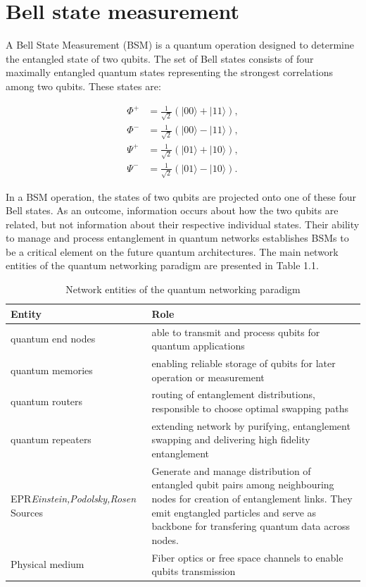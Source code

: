 \documentclass[12pt,a4paper] {report}
\begin{document}
		\section{Bell state measurement}

		A Bell State Measurement (BSM) is a quantum operation designed to determine
		the entangled state of two qubits. The set of Bell states consists of four 
		maximally entangled quantum states representing the strongest correlations
		among two qubits. These states are:

			\begin{align*}
			    \Phi^+ &= \frac{1}{\sqrt{2}} (|00\rangle + |11\rangle), \\
			    \Phi^- &= \frac{1}{\sqrt{2}} (|00\rangle - |11\rangle), \\
			    \Psi^+ &= \frac{1}{\sqrt{2}} (|01\rangle + |10\rangle), \\
			    \Psi^- &= \frac{1}{\sqrt{2}} (|01\rangle - |10\rangle).
			\end{align*}

		In a BSM operation, the states of two qubits are projected onto one of these four Bell states. 
		As an outcome, information occurs about how the two qubits are related, but not information
		about their respective individual states. Their ability to manage and process entanglement
		in quantum networks establishes BSMs to be a critical element on the future quantum architectures. The main network entities of the quantum networking paradigm\cite{e-qnet} are presented in Table 1.1.

		\begin{table}[h!]
		\centering
		\renewcommand{\arraystretch}{1.5}
			\begin{tabular}{|p{5.5cm}|p{10cm}|}
			\hline
			\textbf{Entity} & \textbf{Role} \\ \hline
			quantum end nodes	&  able to transmit and process qubits for quantum applications		\\ \hline
			quantum memories	&  enabling reliable storage of qubits for later operation or measurement 		\\ \hline
			quantum routers		&  routing of entanglement distributions, responsible to choose optimal swapping paths 		\\ \hline
			quantum repeaters	& extending network by purifying, entanglement swapping and delivering high fidelity entanglement 		\\ \hline
				EPR\textit{Einstein,Podolsky,Rosen} Sources		&  Generate and manage distribution of entangled qubit pairs among neighbouring nodes for creation of entanglement links. They emit engtangled particles and serve as backbone for transfering quantum data across nodes.		\\ \hline
			Physical medium		&  Fiber optics or free space channels to enable qubits transmission		\\ \hline
		\end{tabular}
		\caption{Network entities of the quantum networking paradigm}
		\label{tab:example}
		\end{table}
\end{document}
